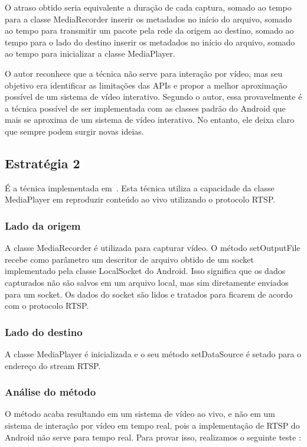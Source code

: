 \documentclass{acm_proc_article-sp}
\begin{document}
O atraso obtido seria equivalente a duração de cada captura, somado ao tempo para a classe MediaRecorder inserir os metadados no início do arquivo, somado ao tempo para transmitir um pacote pela rede da origem ao destino, somado ao tempo para o lado do destino inserir os metadados no início do arquivo, somado ao tempo para inicializar a classe MediaPlayer.

O autor reconhece que a técnica não serve para interação por vídeo, mas seu objetivo era identificar as limitações das APIs e propor a melhor aproximação possível de um sistema de vídeo interativo. Segundo o autor, essa provavelmente é a técnica possível de ser implementada com as classes padrão do Android que mais se aproxima de um sistema de vídeo interativo. No entanto, ele deixa claro que sempre podem surgir novas ideias.

\subsection{Estratégia 2}
É a técnica implementada em~\cite{sipdroid}. Esta técnica utiliza a capacidade da classe MediaPlayer em reproduzir conteúdo ao vivo utilizando o protocolo RTSP.

\subsubsection{Lado da origem}
A classe MediaRecorder é utilizada para capturar vídeo. O método setOutputFile recebe como parâmetro um descritor de arquivo obtido de um socket implementado pela classe LocalSocket do Android. Isso significa que os dados capturados não são salvos em um arquivo local, mas sim diretamente enviados para um socket. Os dados do socket são lidos e tratados para ficarem de acordo com o protocolo RTSP.

\subsubsection{Lado do destino}
A classe MediaPlayer é inicializada e o seu método setDataSource é setado para o endereço do stream RTSP.

\subsubsection{Análise do método}
O método acaba resultando em um sistema de vídeo ao vivo, e não em um sistema de interação por vídeo em tempo real, pois a implementação de RTSP do Android não serve para tempo real. Para provar isso, realizamos o seguinte teste :
\end{document}
